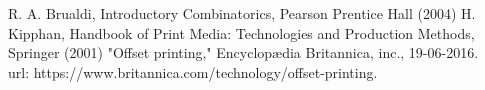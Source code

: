 
\begin{thebibliography}{}
%
%
R. A. Brualdi, Introductory Combinatorics, Pearson Prentice Hall (2004)
H. Kipphan, Handbook of Print Media: Technologies and Production Methods, Springer (2001)
"Offset printing," Encyclop{\ae}dia Britannica, inc., 19-06-2016.\\ url: https://www.britannica.com/technology/offset-printing.

\end{thebibliography}



